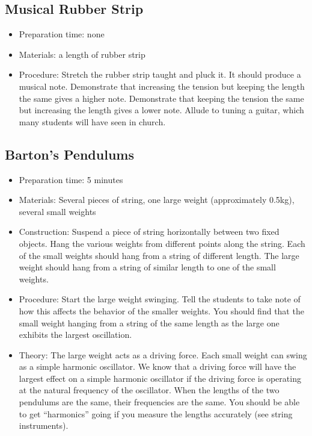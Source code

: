 \subsection{Musical Rubber Strip}
\begin{itemize}
\item{Preparation time: none}
\item{Materials: a length of rubber strip}
\item{Procedure: Stretch the rubber strip taught and pluck it. It should produce a musical note. Demonstrate that increasing the tension but keeping the length the same gives a higher note. Demonstrate that keeping the tension the same but increasing the length gives a lower note. Allude to tuning a guitar, which many students will have seen in church.}
\end{itemize}


\subsection{Barton’s Pendulums}
\begin{itemize}
\item{Preparation time: 5 minutes}
\item{Materials: Several pieces of string, one large weight (approximately 0.5kg), several small weights}
\item{Construction: Suspend a piece of string horizontally between two fixed objects. Hang the various weights from different points along the string. Each of the small weights should hang from a string of different length. The large weight should hang from a string of similar length to one of the small weights.}
\item{Procedure: Start the large weight swinging. Tell the students to take note of how this affects the behavior of the smaller weights. You should find that the small weight hanging from a string of the same length as the large one exhibits the largest oscillation.}
\item{Theory: The large weight acts as a driving force. Each small weight can swing as a simple harmonic oscillator. We know that a driving force will have the largest effect on a simple harmonic oscillator if the driving force is operating at the natural frequency of the oscillator. When the lengths of the two pendulums are the same, their frequencies are the same. You should be able to get “harmonics” going if you measure the lengths accurately (see string instruments).}
\end{itemize}


